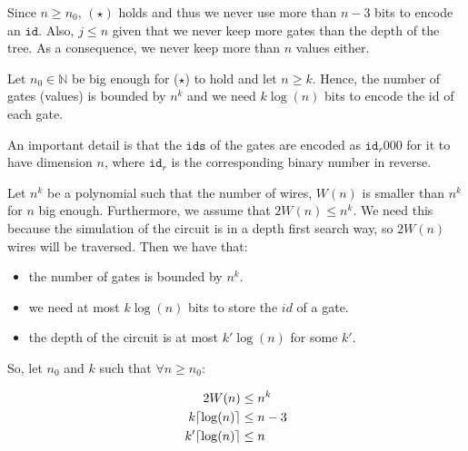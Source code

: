    Since $n\geq n_0$, $(\star)$ holds and thus we never use more than $n-3$ bits to encode an $\texttt{id}$. Also, $j\leq n$ given that we never keep more gates than the depth of the tree. As a consequence, we never keep more than $n$ values either.

 Let $n_0\in\mathbb{N}$ be big enough for ($\star$) to hold and let $n\geq k$. Hence, the number of gates (values) is bounded by $n^k$ and we need $k\log (n)$ bits to encode the id of each gate.

 

    An important detail is that the $\texttt{ids}$ of the gates are encoded as $\texttt{id}_r000$ for it to have dimension $n$, where $\texttt{id}_r$ is the corresponding binary number in reverse.

 Let $n^k$ be a polynomial such that the number of wires, $W(n)$ is smaller than $n^k$ for $n$ big enough. Furthermore, we assume that $2W(n)\leq n^k$. We need this because the \langfor simulation of the circuit is in a depth first search way, so $2W(n)$ wires will be traversed.
    Then we have that:
    \begin{itemize}
        \item the number of gates is bounded by $n^k$.
        \item we need at most $k\log (n)$ bits to store the $id$ of a gate.
        \item the depth of the circuit is at most $k'\log (n)$ for some $k'$.
    \end{itemize}

    So, let $n_0$ and $k$ such that $\forall n\geq n_0:$

    \begin{align*}[right=\empheqrbrace (\star)]
        2W(n)&\leq n^k \\
        k \ceil{\log (n)} &\leq n-3 \\
        k' \ceil{\log(n)} &\leq n
    \end{align*}

